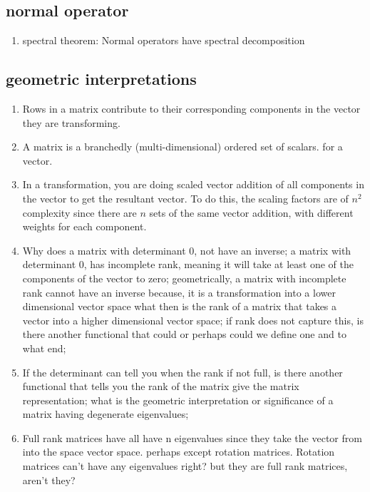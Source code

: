 \documentclass{article}
\begin{document}
    \subsection{normal operator}
        \begin{enumerate}
            \item spectral theorem: Normal operators have spectral decomposition
        \end{enumerate}
    \subsection{geometric interpretations}
    \begin{enumerate}
        \item Rows in a matrix contribute to their corresponding components in the vector they are transforming.
        \item A matrix is a branchedly (multi-dimensional) ordered set of scalars. for a vector.
        \item In a transformation, you are doing scaled vector addition of all components in the vector to get the resultant vector. To do this, the scaling factors are of $n^2$ complexity since there are $n$ sets of the same vector addition, with different weights for each component.
        \item Why does a matrix with determinant 0, not have an inverse; a matrix with determinant 0, has incomplete rank, meaning it will take at least one of the components of the vector to zero; geometrically, a matrix with incomplete rank cannot have an inverse because, it is a transformation into a lower dimensional vector space what then is the rank of a matrix that takes a vector into a higher dimensional vector space; if rank does not capture this, is there another functional that could or perhaps could we define one and to what end;
        \item If the determinant can tell you when the rank if not full, is there another functional that tells you the rank of the matrix give the matrix representation; what is the geometric interpretation or significance of a matrix having degenerate eigenvalues;
        \item Full rank matrices have all have n eigenvalues since they take the vector from into the space vector space. perhaps except rotation matrices. Rotation matrices can't have any eigenvalues right? but they are full rank matrices, aren't they? 

\end{enumerate}
\end{document}
